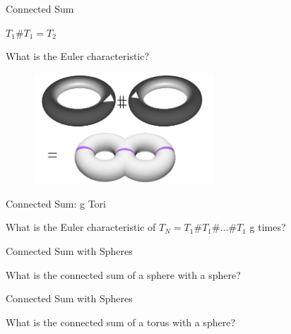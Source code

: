 \documentclass{beamer}
\begin{document}
\begin{frame}{Connected Sum}

$T_1 \# T_1 = T_2$

What is the Euler characteristic?

\begin{figure}[t]
    \includegraphics[width=0.6\textwidth]{ConnectedSum.png}
\end{figure}

\end{frame}


\begin{frame}{Connected Sum: g Tori}

What is the Euler characteristic of $T_N = T_1 \# T_1 \# \hdots \# T_1$ g times?



\end{frame}

\begin{frame}{Connected Sum with Spheres}

What is the connected sum of a sphere with a sphere?

\end{frame}

\begin{frame}{Connected Sum with Spheres}

What is the connected sum of a torus with a sphere?

\end{frame}
\end{document}
